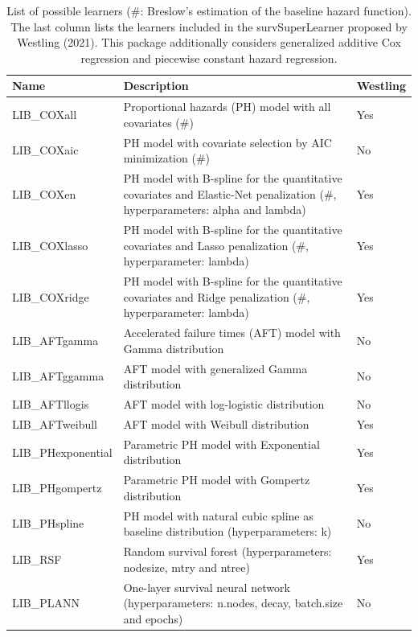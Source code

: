 \begin{table}
\centering
\caption{\label{tab:listemeth-tab-static}List of possible learners (\#: Breslow's estimation of the baseline hazard function). The last column lists the learners included in the survSuperLearner proposed by Westling (2021). This package additionally considers generalized additive Cox regression and piecewise constant hazard regression.}
\centering
\fontsize{8}{10}\selectfont
\begin{tabular}[t]{l>{\raggedright\arraybackslash}p{8cm}l}
\toprule
Name & Description & Westling\\
\midrule
LIB\_COXall & Proportional hazards (PH) model with all covariates (\#) & Yes\\
LIB\_COXaic & PH model with covariate selection by AIC minimization (\#) & No\\
LIB\_COXen & PH model with B-spline for the quantitative covariates and Elastic-Net penalization (\#, hyperparameters: alpha and lambda) & Yes\\
LIB\_COXlasso & PH model with B-spline for the quantitative covariates and Lasso penalization (\#, hyperparameter: lambda) & Yes\\
LIB\_COXridge & PH model with B-spline for the quantitative covariates and Ridge penalization (\#, hyperparameter: lambda) & Yes\\
\addlinespace
LIB\_AFTgamma & Accelerated failure times (AFT) model with Gamma distribution & No\\
LIB\_AFTggamma & AFT model with generalized Gamma distribution & No\\
LIB\_AFTllogis & AFT model with log-logistic distribution & No\\
LIB\_AFTweibull & AFT model with Weibull distribution & Yes\\
LIB\_PHexponential & Parametric PH model with Exponential distribution & Yes\\
\addlinespace
LIB\_PHgompertz & Parametric PH model with Gompertz distribution & Yes\\
LIB\_PHspline & PH model with natural cubic spline as baseline distribution (hyperparameters: k) & No\\
LIB\_RSF & Random survival forest (hyperparameters: nodesize, mtry and ntree) & Yes\\
LIB\_PLANN & One-layer survival neural network (hyperparameters: n.nodes, decay, batch.size and epochs) & No\\
\bottomrule
\end{tabular}
\end{table}

